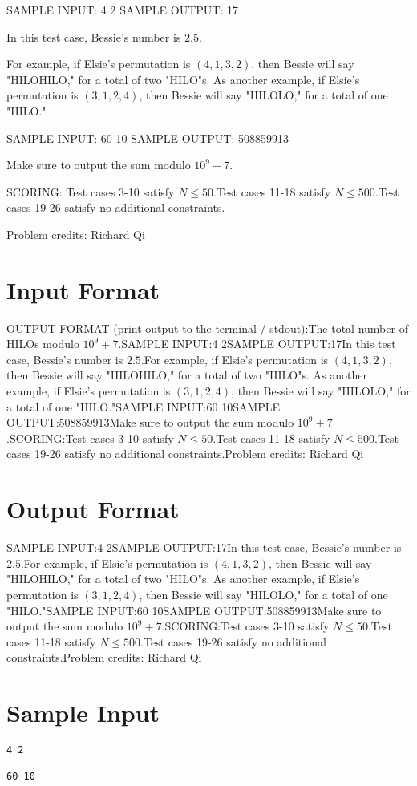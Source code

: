 \documentclass[12pt]{article}
\begin{document}
SAMPLE INPUT:
4 2
SAMPLE OUTPUT: 
17

In this test case, Bessie's number is $2.5$.

For example, if Elsie's permutation is $(4,1,3,2)$, then Bessie will say
"HILOHILO,"  for a total of two "HILO"s. As another example, if Elsie's
permutation is $(3,1,2,4)$, then Bessie will say "HILOLO," for a total of one
"HILO."

SAMPLE INPUT:
60 10
SAMPLE OUTPUT: 
508859913

Make sure to output the sum modulo $10^9+7$.

SCORING:
Test cases 3-10 satisfy $N\le 50$.Test cases 11-18 satisfy $N\le 500$.Test cases 19-26 satisfy no additional constraints.


Problem credits: Richard Qi



\section*{Input Format}
OUTPUT FORMAT (print output to the terminal / stdout):The total number of HILOs modulo $10^9+7$.SAMPLE INPUT:4 2SAMPLE OUTPUT:17In this test case, Bessie's number is $2.5$.For example, if Elsie's permutation is $(4,1,3,2)$, then Bessie will say
"HILOHILO,"  for a total of two "HILO"s. As another example, if Elsie's
permutation is $(3,1,2,4)$, then Bessie will say "HILOLO," for a total of one
"HILO."SAMPLE INPUT:60 10SAMPLE OUTPUT:508859913Make sure to output the sum modulo $10^9+7$.SCORING:Test cases 3-10 satisfy $N\le 50$.Test cases 11-18 satisfy $N\le 500$.Test cases 19-26 satisfy no additional constraints.Problem credits: Richard Qi

\section*{Output Format}
SAMPLE INPUT:4 2SAMPLE OUTPUT:17In this test case, Bessie's number is $2.5$.For example, if Elsie's permutation is $(4,1,3,2)$, then Bessie will say
"HILOHILO,"  for a total of two "HILO"s. As another example, if Elsie's
permutation is $(3,1,2,4)$, then Bessie will say "HILOLO," for a total of one
"HILO."SAMPLE INPUT:60 10SAMPLE OUTPUT:508859913Make sure to output the sum modulo $10^9+7$.SCORING:Test cases 3-10 satisfy $N\le 50$.Test cases 11-18 satisfy $N\le 500$.Test cases 19-26 satisfy no additional constraints.Problem credits: Richard Qi

\section*{Sample Input}
\begin{verbatim}
4 2

60 10
\end{verbatim}
\end{document}
